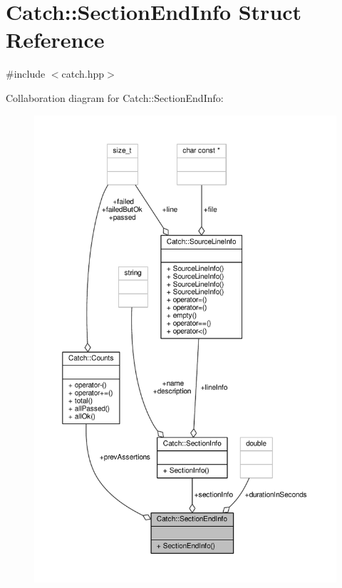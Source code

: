 \hypertarget{struct_catch_1_1_section_end_info}{\section{Catch\-:\-:Section\-End\-Info Struct Reference}
\label{struct_catch_1_1_section_end_info}
}


{\ttfamily \#include $<$catch.\-hpp$>$}



Collaboration diagram for Catch\-:\-:Section\-End\-Info\-:
\nopagebreak
\begin{figure}[H]
\begin{center}
\leavevmode
\includegraphics[width=350pt]{struct_catch_1_1_section_end_info__coll__graph}
\end{center}
\end{figure}
